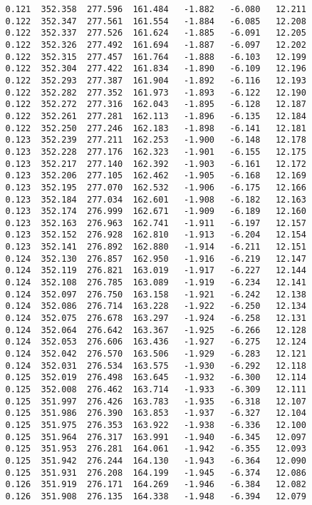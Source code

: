 \begin{verbatim}
   0.121  352.358  277.596  161.484   -1.882   -6.080   12.211
   0.122  352.347  277.561  161.554   -1.884   -6.085   12.208
   0.122  352.337  277.526  161.624   -1.885   -6.091   12.205
   0.122  352.326  277.492  161.694   -1.887   -6.097   12.202
   0.122  352.315  277.457  161.764   -1.888   -6.103   12.199
   0.122  352.304  277.422  161.834   -1.890   -6.109   12.196
   0.122  352.293  277.387  161.904   -1.892   -6.116   12.193
   0.122  352.282  277.352  161.973   -1.893   -6.122   12.190
   0.122  352.272  277.316  162.043   -1.895   -6.128   12.187
   0.122  352.261  277.281  162.113   -1.896   -6.135   12.184
   0.122  352.250  277.246  162.183   -1.898   -6.141   12.181
   0.123  352.239  277.211  162.253   -1.900   -6.148   12.178
   0.123  352.228  277.176  162.323   -1.901   -6.155   12.175
   0.123  352.217  277.140  162.392   -1.903   -6.161   12.172
   0.123  352.206  277.105  162.462   -1.905   -6.168   12.169
   0.123  352.195  277.070  162.532   -1.906   -6.175   12.166
   0.123  352.184  277.034  162.601   -1.908   -6.182   12.163
   0.123  352.174  276.999  162.671   -1.909   -6.189   12.160
   0.123  352.163  276.963  162.741   -1.911   -6.197   12.157
   0.123  352.152  276.928  162.810   -1.913   -6.204   12.154
   0.123  352.141  276.892  162.880   -1.914   -6.211   12.151
   0.124  352.130  276.857  162.950   -1.916   -6.219   12.147
   0.124  352.119  276.821  163.019   -1.917   -6.227   12.144
   0.124  352.108  276.785  163.089   -1.919   -6.234   12.141
   0.124  352.097  276.750  163.158   -1.921   -6.242   12.138
   0.124  352.086  276.714  163.228   -1.922   -6.250   12.134
   0.124  352.075  276.678  163.297   -1.924   -6.258   12.131
   0.124  352.064  276.642  163.367   -1.925   -6.266   12.128
   0.124  352.053  276.606  163.436   -1.927   -6.275   12.124
   0.124  352.042  276.570  163.506   -1.929   -6.283   12.121
   0.124  352.031  276.534  163.575   -1.930   -6.292   12.118
   0.125  352.019  276.498  163.645   -1.932   -6.300   12.114
   0.125  352.008  276.462  163.714   -1.933   -6.309   12.111
   0.125  351.997  276.426  163.783   -1.935   -6.318   12.107
   0.125  351.986  276.390  163.853   -1.937   -6.327   12.104
   0.125  351.975  276.353  163.922   -1.938   -6.336   12.100
   0.125  351.964  276.317  163.991   -1.940   -6.345   12.097
   0.125  351.953  276.281  164.061   -1.942   -6.355   12.093
   0.125  351.942  276.244  164.130   -1.943   -6.364   12.090
   0.125  351.931  276.208  164.199   -1.945   -6.374   12.086
   0.126  351.919  276.171  164.269   -1.946   -6.384   12.082
   0.126  351.908  276.135  164.338   -1.948   -6.394   12.079

\end{verbatim}
